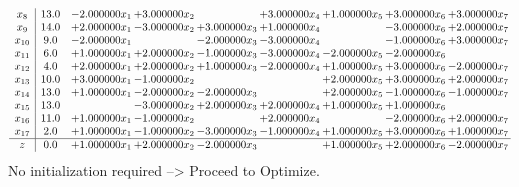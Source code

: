 \documentclass[10pt]{article}
\begin{document}
\[\begin{array}{c| c c@{\hskip 2pt} c@{\hskip 2pt} c@{\hskip 2pt} c@{\hskip 2pt} c@{\hskip 2pt} c@{\hskip 2pt} c@{\hskip 2pt} }
 x_{8}   &  13.0 & -2.000000 x_{1} & + 3.000000 x_{2} &   & + 3.000000 x_{4} & + 1.000000 x_{5} & + 3.000000 x_{6} & + 3.000000 x_{7}\\
 x_{9}   &  14.0 & + 2.000000 x_{1} & -3.000000 x_{2} & + 3.000000 x_{3} & + 1.000000 x_{4} &   & -3.000000 x_{6} & + 2.000000 x_{7}\\
 x_{10}   &  9.0 & -2.000000 x_{1} &   & -2.000000 x_{3} & -3.000000 x_{4} &   & -1.000000 x_{6} & + 3.000000 x_{7}\\
 x_{11}   &  6.0 & + 1.000000 x_{1} & + 2.000000 x_{2} & -1.000000 x_{3} & -3.000000 x_{4} & -2.000000 x_{5} & -2.000000 x_{6} &   \\
 x_{12}   &  4.0 & + 2.000000 x_{1} & + 2.000000 x_{2} & + 1.000000 x_{3} & -2.000000 x_{4} & + 1.000000 x_{5} & + 3.000000 x_{6} & -2.000000 x_{7}\\
 x_{13}   &  10.0 & + 3.000000 x_{1} & -1.000000 x_{2} &    &   & + 2.000000 x_{5} & + 3.000000 x_{6} & + 2.000000 x_{7}\\
 x_{14}   &  13.0 & + 1.000000 x_{1} & -2.000000 x_{2} & -2.000000 x_{3} &   & + 2.000000 x_{5} & -1.000000 x_{6} & -1.000000 x_{7}\\
 x_{15}   &  13.0  &   & -3.000000 x_{2} & + 2.000000 x_{3} & + 2.000000 x_{4} & + 1.000000 x_{5} & + 1.000000 x_{6} &   \\
 x_{16}   &  11.0 & + 1.000000 x_{1} & -1.000000 x_{2} &   & + 2.000000 x_{4} &   & -2.000000 x_{6} & + 2.000000 x_{7}\\
 x_{17}   &  2.0 & + 1.000000 x_{1} & -1.000000 x_{2} & -3.000000 x_{3} & -1.000000 x_{4} & + 1.000000 x_{5} & + 3.000000 x_{6} & + 1.000000 x_{7}\\
\hline
z    &  0.0 & + 1.000000 x_{1} & + 2.000000 x_{2} & -2.000000 x_{3} &   & + 1.000000 x_{5} & + 2.000000 x_{6} & -2.000000 x_{7}\\
\end{array}\]
No initialization required --> Proceed to Optimize. 
\end{document}
